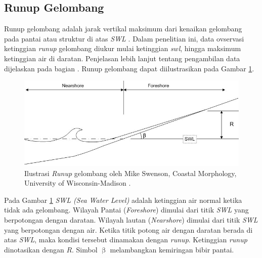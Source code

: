 

\subsection{Runup Gelombang}
Runup gelombang adalah jarak vertikal maksimum dari kenaikan gelombang pada pantai atau struktur di atas \emph{SWL} \cite{sorensen2005basic}. Dalam penelitian ini, data ovservasi ketinggian \emph{runup} gelombang diukur mulai ketinggian \emph{swl}, hingga maksimum ketinggian air di daratan. Penjelasan lebih lanjut tentang pengambilan data dijelaskan pada bagian . Runup gelombang dapat diilustrasikan pada Gambar \ref{fig:runup}.
\begin{figure}[h]
    \begin{center}
        \includegraphics[scale=0.7]{./images/runup_gelombang.jpg}
    \end{center}
    \caption{Ilustrasi \emph{Runup} gelombang oleh Mike Swenson, Coastal Morphology, University of Wisconsin-Madison \cite{MikeSwenson:WaveRunup}.}
    \label{fig:runup}
\end{figure}
\FloatBarrier
Pada Gambar \ref{fig:runup} \emph{SWL (Sea Water Level)} adalah ketinggian air normal ketika tidak ada gelombang. Wilayah Pantai (\emph{Foreshore}) dimulai dari titik \emph{SWL} yang berpotongan dengan daratan. Wilayah lautan (\emph{Nearshore}) dimulai dari titik \emph{SWL} yang berpotongan dengan air. Ketika titik potong air dengan daratan berada di atas \emph{SWL}, maka kondisi tersebut dinamakan dengan \emph{runup}. Ketinggian \emph{runup} dinotasikan dengan $R$. Simbol $\upbeta$ melambangkan kemiringan bibir pantai.

